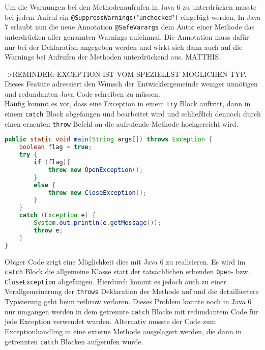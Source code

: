 \documentclass[times, 10pt,twocolumn]{article}
\begin{document}
Um die Warnungen bei den Methodenaufrufen in Java 6 zu unterdrücken musste bei jedem Aufruf ein 
\texttt{@SuppressWarnings(}"\texttt{unchecked}"\texttt{)} eingefügt werden. In Java 7 erlaubt nun die neue Annotation \texttt{@SafeVarargs} dem Autor einer Methode das unterdrücken aller genannten Warnings aufeinmal. Die Annotation muss dafür nur bei der Deklaration angegeben werden und wirkt sich dann auch auf die Warnings bei Aufrufen der Methoden unterdrückend aus.
MATTHIS

->REMINDER: EXCEPTION IST VOM SPEZIELLST MÖGLICHEN TYP.
Dieses Feature adressiert den Wunsch der Entwicklergemeinde weniger unnötigen und redundanten Java Code schreiben zu müssen.\cite{sbJ7exeptions}\\

Häufig kommt es vor, dass eine Exception in einem \texttt{try} Block auftritt, dann in einem \texttt{catch} Block abgefangen und bearbeitet wird und schließlich dennoch durch einen erneuten \texttt{throw} Befehl an die aufrufende Methode hochgereicht wird.

\begin{lstlisting}[language=java,breaklines=true]
public static void main(String args[]) throws Exception {
    boolean flag = true;
    try {
        if (flag){
            throw new OpenException();
        }
        else {
            throw new CloseException();
        }
    }
    catch (Exception e) {
        System.out.println(e.getMessage());
        throw e;
    }
}
\end{lstlisting}

Obiger Code\cite{sbJ7exeptions} zeigt eine Möglichkeit dies mit Java 6 zu realisieren. Es wird im \texttt{catch} Block die allgemeine  Klasse statt der tatsächlichen erbenden \texttt{Open}- bzw. \texttt{CloseException} abgefangen. Hierdurch kommt es jedoch auch zu einer Verallgemeinerung der \texttt{throws} Deklaration der Methode auf  und die detailliertere Typisierung geht beim rethrow verloren. Dieses Problem konnte noch in Java 6 nur umgangen werden in dem getrennte \texttt{catch} Blöcke mit redundantem Code für jede Exception verwendet wurden. Alternativ musste der Code zum Exceptionhandling in eine externe Methode ausgelagert werden, die dann in getrennten \texttt{catch} Blöcken aufgerufen wurde.\cite{scjp6}\\
\end{document}
